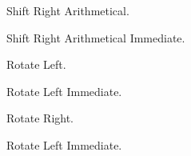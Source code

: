 \glqq Shift Right Arithmetical\grqq.


\glqq Shift Right Arithmetical Immediate\grqq.



\glqq Rotate Left\grqq.


\glqq Rotate Left Immediate\grqq.



\glqq Rotate Right\grqq.


\glqq Rotate Left Immediate\grqq.



